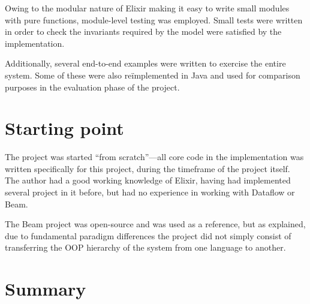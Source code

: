 Owing to the modular nature of Elixir making it easy to write small modules with pure functions, module-level testing was employed.
Small tests were written in order to check the invariants required by the model were satisfied by the implementation.


Additionally, several end-to-end examples were written to exercise the entire system.
Some of these were also re\"implemented in Java and used for comparison purposes in the evaluation phase of the project.

\section{Starting point}\label{sec:prep:starting}

The project was started ``from scratch''---all core code in the implementation was written specifically for this project, during the timeframe of the project itself.
The author had a good working knowledge of Elixir, having had implemented several project in it before, but had no experience in working with Dataflow or Beam.

The Beam project was open-source and was used as a reference, but as explained, due to fundamental paradigm differences the project did not simply consist of transferring the OOP hierarchy of the system from one language to another.

\section{Summary}\label{sec:prep:summary}

